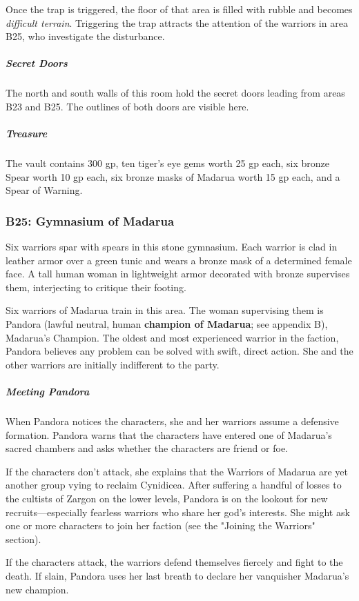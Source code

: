 \documentclass[10pt,a4paper,twoside,bg=print,twocolumn,openany,nodeprecatedcode]{dndbook}
\begin{document}
Once the trap is triggered, the floor of that area is filled with rubble and becomes \textit{difficult terrain}. Triggering the trap attracts the attention of the warriors in area B25, who investigate the disturbance.

\subparagraph{Secret Doors}
The north and south walls of this room hold the secret doors leading from areas B23 and B25. The outlines of both doors are visible here.

\subparagraph{Treasure}
The vault contains 300 gp, ten tiger's eye gems worth 25 gp each, six bronze Spear worth 10 gp each, six bronze masks of Madarua worth 15 gp each, and a Spear of Warning.

\subsubsection{B25: Gymnasium of Madarua}
\begin{DndReadAloud}{}
Six warriors spar with spears in this stone gymnasium. Each warrior is clad in leather armor over a green tunic and wears a bronze mask of a determined female face. A tall human woman in lightweight armor decorated with bronze supervises them, interjecting to critique their footing.

\end{DndReadAloud}

Six warriors of Madarua train in this area. The woman supervising them is Pandora (lawful neutral, human \textbf{champion of Madarua}; see appendix B), Madarua's Champion. The oldest and most experienced warrior in the faction, Pandora believes any problem can be solved with swift, direct action. She and the other warriors are initially indifferent to the party.

\subparagraph{Meeting Pandora}
When Pandora notices the characters, she and her warriors assume a defensive formation. Pandora warns that the characters have entered one of Madarua's sacred chambers and asks whether the characters are friend or foe.

If the characters don't attack, she explains that the Warriors of Madarua are yet another group vying to reclaim Cynidicea. After suffering a handful of losses to the cultists of Zargon on the lower levels, Pandora is on the lookout for new recruits—especially fearless warriors who share her god's interests. She might ask one or more characters to join her faction (see the "Joining the Warriors" section).

If the characters attack, the warriors defend themselves fiercely and fight to the death. If slain, Pandora uses her last breath to declare her vanquisher Madarua's new champion.
\end{document}
